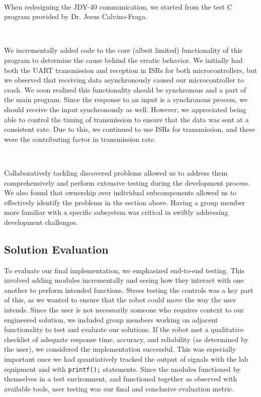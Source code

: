 \documentclass{article}
\begin{document}
\

When redesigning the JDY-40 communication, we started from the test C program provided by Dr. Jesus Calvino-Fraga.

\

We incrementally added code to the core (albeit limited) functionality of this program to determine the cause behind
the erratic behavior. We initially had both the UART transmission and reception in ISRs for both microcontrollers, but we observed that receiving data asynchronously
caused our microcontroller to crash. We soon realized this functionality should be synchronous and a part of the main program.
Since the response to an input is a synchronous process, we should receive the input synchronously as well. However, we appreciated being able to
control the timing of transmission to ensure that the data was sent at a consistent rate. Due to this, we continued to use ISRs for transmission,
and these were the contributing factor in transmission rate.

\

Collaboratively tackling discovered problems allowed us to address them comprehensively and perform extensive testing during the
development process. We also found that ownership over individual subcomponents allowed us to effectively identify the problems in the section above. Having a group member
more familiar with a specific subsystem was critical in swiftly addressing development challenges.


\subsection{Solution Evaluation}

To evaluate our final implementation, we emphasized end-to-end testing. This involved adding modules incrementally and seeing how they interact with one another to
perform intended functions. Stress testing the controls was a key part of this, as we wanted to ensure that the robot could move the way the user intends. Since the user is not necessarily someone who
requires context to our engineered solution, we included group members working on adjacent functionality to test and evaluate our solutions. If the robot met a qualitative checklist
of adequate response time, accuracy, and reliability (as determined by the user), we considered the implementation successful. This was especially important once we had quantiatively tracked the
output of signals with the lab equipment and with \texttt{printf();} statements. Since the modules functioned by themselves in a test environment, and functioned together as observed with
available tools, user testing was our final and conclusive evaluation metric.
\end{document}
